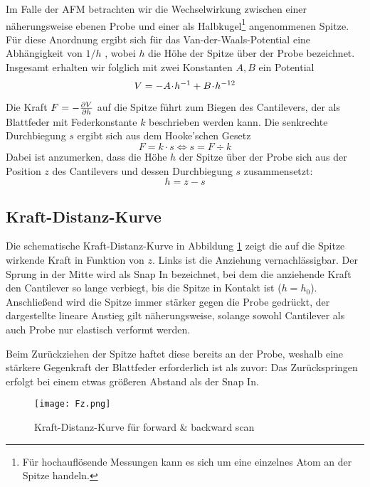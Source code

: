 Im Falle der AFM betrachten wir die Wechselwirkung zwischen einer näherungsweise ebenen Probe und einer als Halbkugel\footnote{Für hochauflösende Messungen kann es sich um eine einzelnes Atom an der Spitze handeln.} angenommenen Spitze. Für diese Anordnung ergibt sich für das Van-der-Waals-Potential eine Abhängigkeit von $1/h$ \cite[S. 5]{lit:hampp}, wobei $h$ die Höhe der Spitze über der Probe bezeichnet. Insgesamt erhalten wir folglich mit zwei Konstanten $A, B$ ein Potential
\begin{equation}
  V =  - A \!\cdot\! h^{-1} + B \!\cdot\! h^{-12} \label{eq:V_Spitze}
\end{equation}

Die Kraft $F = - \frac{\partial V}{\partial h}$ auf die Spitze führt zum Biegen des Cantilevers, der als Blattfeder mit Federkonstante $k$ beschrieben werden kann. Die senkrechte Durchbiegung $s$ ergibt sich aus dem Hooke'schen Gesetz
\begin{equation}
  F =  k \cdot s	\iff	s = F \div k
\end{equation}
Dabei ist anzumerken, dass die Höhe $h$ der Spitze über der Probe sich aus der Position $z$ des Cantilevers und dessen Durchbiegung $s$ zusammensetzt:
\begin{equation}
  h = z - s
\end{equation}


\subsection{Kraft-Distanz-Kurve}
Die schematische Kraft-Distanz-Kurve in Abbildung \ref{fig:Fz} zeigt die auf die Spitze wirkende Kraft in Funktion von $z$. Links ist die Anziehung vernachlässigbar. Der Sprung in der Mitte wird als Snap In bezeichnet, bei dem die anziehende Kraft den Cantilever so lange verbiegt, bis die Spitze in Kontakt ist ($h = h_0$). Anschließend wird die Spitze immer stärker gegen die Probe gedrückt, der dargestellte lineare Anstieg gilt näherungsweise, solange sowohl Cantilever als auch Probe nur elastisch verformt werden.

Beim Zurückziehen der Spitze haftet diese bereits an der Probe, weshalb eine stärkere Gegenkraft der Blattfeder erforderlich ist als zuvor: Das Zurückspringen erfolgt bei einem etwas größeren Abstand als der Snap In.

\begin{figure}[h]
	\centering
	\texttt{[image: Fz.png]}
	\caption{Kraft-Distanz-Kurve für forward \& backward scan \cite{lit:Fz}}
	\label{fig:Fz}
\end{figure}

